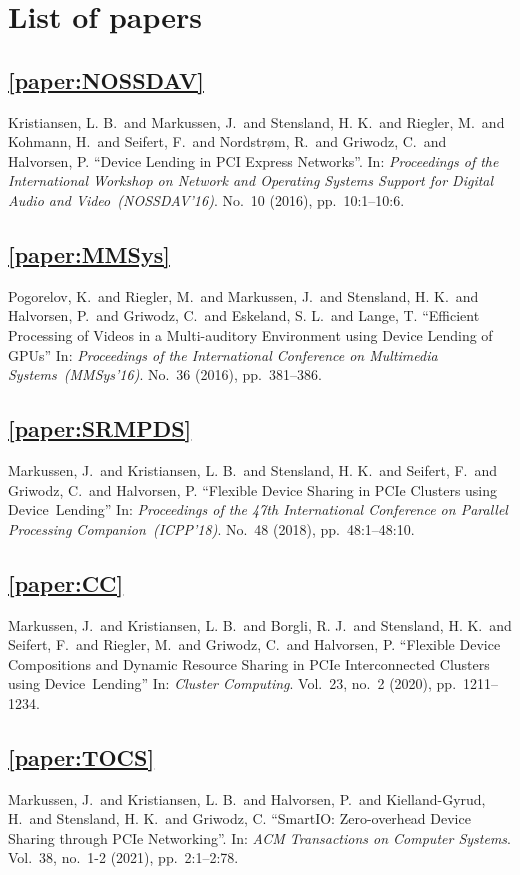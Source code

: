 \chapter{List of papers}

\section*{\cref{paper:NOSSDAV}}
Kristiansen, L. B.\ and Markussen, J.\ and Stensland, H. K.\ and Riegler, M.\ and Kohmann, H.\ and Seifert, F.\ and Nordstr{\o}m, R.\ and Griwodz, C.\ and Halvorsen, P.
\enquote{Device Lending in PCI Express Networks}.
In: \emph{Proceedings of the International Workshop on Network and Operating Systems Support for Digital Audio and Video~(NOSSDAV'16)}.
No.~10 (2016),
pp.~10:1--10:6.


\section*{\cref{paper:MMSys}}
Pogorelov, K.\ and Riegler, M.\ and Markussen, J.\ and Stensland, H. K.\ and Halvorsen, P.\ and Griwodz, C.\ and Eskeland, S. L.\ and Lange, T.
\enquote{Efficient Processing of Videos in a Multi-auditory Environment using Device Lending of GPUs}
In: \emph{Proceedings of the International Conference on Multimedia Systems~(MMSys'16)}.
No.~36 (2016),
pp.~381--386.


\section*{\cref{paper:SRMPDS}}
Markussen, J.\ and Kristiansen, L. B.\ and Stensland, H. K.\ and Seifert, F.\ and Griwodz, C.\ and Halvorsen, P.
\enquote{Flexible Device Sharing in PCIe Clusters using Device~Lending}
In: \emph{Proceedings of the 47th International Conference on Parallel Processing Companion~(ICPP'18)}.
No.~48 (2018),
pp.~48:1--48:10.


\section*{\cref{paper:CC}}
Markussen, J.\ and Kristiansen, L. B.\ and Borgli, R. J.\ and Stensland, H. K.\ and Seifert, F.\ and Riegler, M.\ and Griwodz, C.\ and Halvorsen, P.
\enquote{Flexible Device Compositions and Dynamic Resource Sharing in PCIe Interconnected Clusters using Device~Lending}
In: \emph{Cluster Computing}.
Vol.~23,
no.~2
(2020),
pp.~1211--1234.


\section*{\cref{paper:TOCS}}
Markussen, J.\ and Kristiansen, L. B.\ and Halvorsen, P.\ and Kielland-Gyrud, H.\ and Stensland, H. K.\ and Griwodz, C.
\enquote{SmartIO: Zero-overhead Device Sharing through PCIe Networking}.
In: \emph{ACM Transactions on Computer Systems}.
Vol.~38,
no.~1-2
(2021),
pp.~2:1--2:78.

